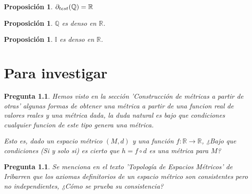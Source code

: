 \documentclass[oneside]{book} %
\theoremstyle{Teorema}
\newtheorem{Proposicion}[Definicion]{Proposición}
\newtheorem{Pregunta}[Definicion]{Pregunta}
\theoremstyle{Ejemplos}
\theoremstyle{[Obs]}
\def \test {test}
\newcommand{\frontera}[2][\test]{\ifx \test #1 {\partial(#2)} \else {\partial_{#1}(#2)} \fi} %
\renewcommand{\{}{\left\lbrace} %
\renewcommand{\}}{\right\rbrace} %
\newcommand{\R}{\mathbb{R}} %
\newcommand{\Q}{\mathbb{Q}} %
\newcommand{\I}{\mathbb{I}} %
\begin{document}
		\begin{Proposicion}\setlength{\parindent}{0em}
				
			$\frontera{\mathbb{Q}} = \R$

		\end{Proposicion}

		\begin{Proposicion}
				
			$\Q$ es denso en $\R$. \\

		\end{Proposicion}

		\begin{Proposicion}
			
			$\I$ es denso en $\R$. \\

		\end{Proposicion}

	\chapter{Para investigar}

			\begin{Pregunta}\setlength{\parindent}{0em}
				
				Hemos visto en la sección 'Construcción de métricas a partir de otras' algunas formas de obtener una métrica a partir de una funcion real de valores reales y una métrica dada, la duda natural es bajo que condiciones cualquier funcion de este tipo genera una métrica.

				Esto es, dado un espacio métrico $(M, d)$ y una función $f : \R \to \R$, ¿Bajo que condiciones (Si y solo si) es cierto que $h = f \circ d$ es una métrica para $M$?

			\end{Pregunta}

			\begin{Pregunta}

				Se menciona en el texto 'Topología de Espacios Métricos' de Iribarren que los axiomas definitorios de un espacio métrico son consistentes pero no independientes, ¿Cómo se prueba su consistencia?

			\end{Pregunta}

	\color{white} 
	 
	
	
\end{document}
